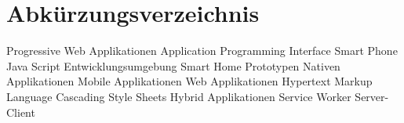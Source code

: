 \chapter*{Abkürzungsverzeichnis}
\pagestyle{plain}

\begin{acronym}[AUTOSAR]

   				{Progressive Web Applikationen}
  				{Application Programming Interface}
  				{Smart Phone}
  				{Java Script}
  				{Entwicklungsumgebung}
  				{Smart Home Prototypen}
  				{Nativen Applikationen}
  				{Mobile Applikationen}
 					{Web Applikationen}
 				{Hypertext Markup Language}
 				{Cascading Style Sheets}
 				{Hybrid Applikationen}
 					{Service Worker}
 					{Server-Client}
\end{acronym}